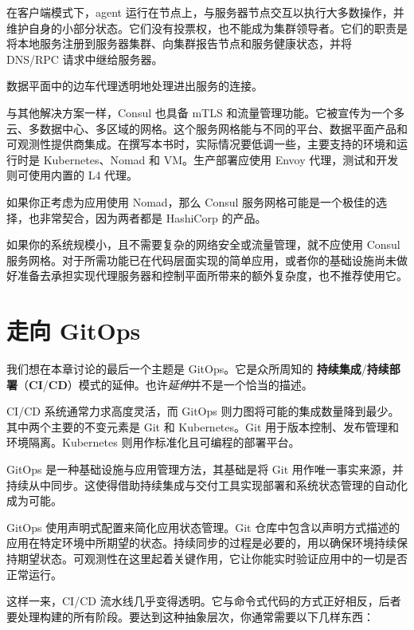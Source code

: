 \label{idx:2058}
在客户端模式下，agent 运行在节点上，与服务器节点交互以执行大多数操作，并维护自身的小部分状态。它们没有投票权，也不能成为集群领导者。它们的职责是将本地服务注册到服务器集群、向集群报告节点和服务健康状态，并将 DNS/RPC 请求中继给服务器。

数据平面中的边车代理透明地处理进出服务的连接。

\label{idx:2059}
与其他解决方案一样，Consul 也具备 mTLS 和流量管理功能。它被宣传为一个多云、多数据中心、多区域的网格。这个服务网格能与不同的平台、数据平面产品和可观测性提供商集成。在撰写本书时，实际情况要低调一些，主要支持的环境和运行时是 Kubernetes、Nomad 和 VM。生产部署应使用 Envoy 代理，测试和开发则可使用内置的 L4 代理。

如果你正考虑为应用使用 Nomad，那么 Consul 服务网格可能是一个极佳的选择，也非常契合，因为两者都是 HashiCorp 的产品。

如果你的系统规模小，且不需要复杂的网络安全或流量管理，就不应使用 Consul 服务网格。对于所需功能已在代码层面实现的简单应用，或者你的基础设施尚未做好准备去承担实现代理服务器和控制平面所带来的额外复杂度，也不推荐使用它。

\section{走向 GitOps}

\label{idx:2060}
\label{idx:2061}
我们想在本章讨论的最后一个主题是 GitOps。它是众所周知的 \textbf{持续集成}/\textbf{持续部署}（\textbf{CI}/\textbf{CD}）模式的延伸。也许\emph{延伸}并不是一个恰当的描述。

CI/CD 系统通常力求高度灵活，而 GitOps 则力图将可能的集成数量降到最少。其中两个主要的不变元素是 Git 和 Kubernetes。Git 用于版本控制、发布管理和环境隔离。Kubernetes 则用作标准化且可编程的部署平台。


GitOps 是一种基础设施与应用管理方法，其基础是将 Git 用作唯一事实来源，并持续从中同步。这使得借助持续集成与交付工具实现部署和系统状态管理的自动化成为可能。

\label{idx:2062}
GitOps 使用声明式配置来简化应用状态管理。Git 仓库中包含以声明方式描述的应用在特定环境中所期望的状态。持续同步的过程是必要的，用以确保环境持续保持期望状态。可观测性在这里起着关键作用，它让你能实时验证应用中的一切是否正常运行。

这样一来，CI/CD 流水线几乎变得透明。它与命令式代码的方式正好相反，后者要处理构建的所有阶段。要达到这种抽象层次，你通常需要以下几样东西：


